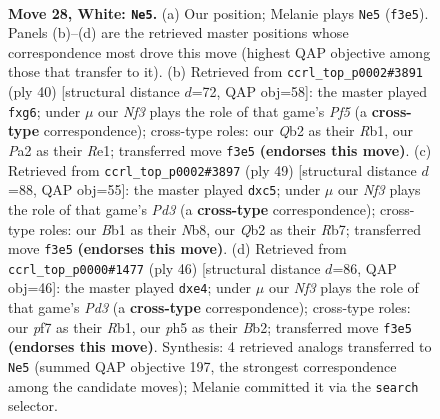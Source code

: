 \documentclass[11pt]{article}
\begin{document}
\clearpage

\begin{figure}[p]\centering
\begin{subfigure}{0.46\textwidth}\centering
\resizebox{\linewidth}{!}{%
\newchessgame
\chessboard[
  setfen={rnbqr1k1/5p2/1p3np1/3P3p/p1P1p3/B4NPP/PQ2RP2/RB4K1 w - - 0 28},
  showmover=false,
  pgfstyle=straightmove, color=movearrow, markmove={f3-e5}
]}
\caption{}
\end{subfigure}\hfill
\begin{subfigure}{0.46\textwidth}\centering
\resizebox{\linewidth}{!}{%
\newchessgame
\chessboard[
  setfen={1r2r1k1/2pqnp1p/p4bp1/1p3P2/3PBB2/2P3Q1/P4P1P/1R2R1K1 w - - 2 21},
  showmover=false,
  pgfstyle=straightmove, color=movearrow, markmove={f5-g6}
]}
\caption{}
\end{subfigure}
\\[4pt]
\begin{subfigure}{0.46\textwidth}\centering
\resizebox{\linewidth}{!}{%
\newchessgame
\chessboard[
  setfen={1n3rk1/1rq3b1/p2p3p/R1PPppp1/8/Q1N2NP1/1P3P1P/1R4K1 b - - 0 25},
  showmover=false,
  pgfstyle=straightmove, color=movearrow, markmove={d6-c5}
]}
\caption{}
\end{subfigure}\hfill
\begin{subfigure}{0.46\textwidth}\centering
\resizebox{\linewidth}{!}{%
\newchessgame
\chessboard[
  setfen={5rk1/1bqr2pp/1p1pp3/p1n5/2P1pPP1/P2PQ2P/1B3RB1/1R5K w - - 0 24},
  showmover=false,
  pgfstyle=straightmove, color=movearrow, markmove={d3-e4}
]}
\caption{}
\end{subfigure}
\caption{\textbf{Move 28, White: \texttt{Ne5}.} (a) Our position; Melanie plays \texttt{Ne5} (\texttt{f3e5}). Panels (b)--(d) are the retrieved master positions whose correspondence most drove this move (highest QAP objective among those that transfer to it). (b) Retrieved from \texttt{ccrl\_top\_p0002\#3891} (ply 40) [structural distance $d$=72, QAP obj=58]: the master played \texttt{fxg6}; under $\mu$ our \emph{Nf3} plays the role of that game's \emph{Pf5} (a \textbf{cross-type} correspondence); cross-type roles: our \emph{Q}b2 as their \emph{R}b1, our \emph{P}a2 as their \emph{R}e1; transferred move \texttt{f3e5} \textbf{(endorses this move)}. (c) Retrieved from \texttt{ccrl\_top\_p0002\#3897} (ply 49) [structural distance $d$=88, QAP obj=55]: the master played \texttt{dxc5}; under $\mu$ our \emph{Nf3} plays the role of that game's \emph{Pd3} (a \textbf{cross-type} correspondence); cross-type roles: our \emph{B}b1 as their \emph{N}b8, our \emph{Q}b2 as their \emph{R}b7; transferred move \texttt{f3e5} \textbf{(endorses this move)}. (d) Retrieved from \texttt{ccrl\_top\_p0000\#1477} (ply 46) [structural distance $d$=86, QAP obj=46]: the master played \texttt{dxe4}; under $\mu$ our \emph{Nf3} plays the role of that game's \emph{Pd3} (a \textbf{cross-type} correspondence); cross-type roles: our \emph{p}f7 as their \emph{R}b1, our \emph{p}h5 as their \emph{B}b2; transferred move \texttt{f3e5} \textbf{(endorses this move)}. Synthesis: 4 retrieved analogs transferred to \texttt{Ne5} (summed QAP objective 197, the strongest correspondence among the candidate moves); Melanie committed it via the \texttt{search} selector.}
\label{fig:thought-m54}
\end{figure}
\end{document}
